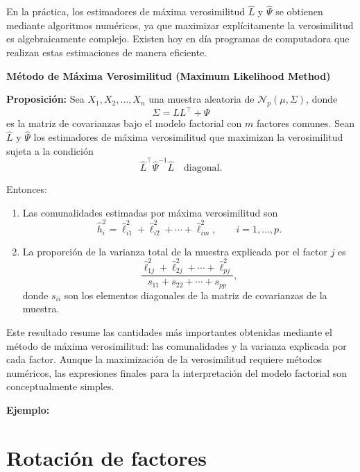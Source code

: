 \documentclass[
]{book}
\newenvironment{blackbox}{
  \definecolor{shadecolor}{HTML}{8B8989}%
  \color{white}
  \begin{shaded}}
 {\end{shaded}}
\begin{document}
En la práctica, los estimadores de máxima verosimilitud \(\hat{L}\) y \(\hat{\Psi}\)
se obtienen mediante algoritmos numéricos, ya que maximizar explícitamente la
verosimilitud es algebraicamente complejo. Existen hoy en día programas de
computadora que realizan estas estimaciones de manera eficiente.

\begin{blackbox}

\begin{center}
\textbf{Método de Máxima Verosimilitud (Maximum Likelihood Method)}

\end{center}

\textbf{Proposición: } Sea \(X_1, X_2, \ldots, X_n\) una muestra aleatoria de \(\mathcal{N}_p(\mu,\Sigma)\),
donde
\[
\Sigma = LL^{\top} + \Psi
\]
es la matriz de covarianzas bajo el modelo factorial con \(m\) factores comunes.
Sean \(\hat{L}\) y \(\hat{\Psi}\) los estimadores de máxima verosimilitud que
maximizan la verosimilitud sujeta a la condición
\[
\hat{L}^{\top} \hat{\Psi}^{-1} \hat{L} \quad \text{diagonal}.
\]

Entonces:

\begin{enumerate}
\def\labelenumi{\arabic{enumi})}
\item
  Las comunalidades estimadas por máxima verosimilitud son
  \[
   \hat{h}_i^2 = \hat{\ell}_{i1}^2 + \hat{\ell}_{i2}^2 + \cdots + \hat{\ell}_{im}^2,
   \qquad i=1,\ldots,p.
   \]
\item
  La proporción de la varianza total de la muestra explicada por el
  factor \(j\) es
  \[
   \frac{
       \hat{\ell}_{1j}^2 + \hat{\ell}_{2j}^2 + \cdots + \hat{\ell}_{pj}^2
   }{
       s_{11} + s_{22} + \cdots + s_{pp}
   },
   \]
  donde \(s_{ii}\) son los elementos diagonales de la matriz de covarianzas de
  la muestra.
\end{enumerate}

\end{blackbox}

Este resultado resume las cantidades más importantes obtenidas mediante el
método de máxima verosimilitud: las comunalidades y la varianza explicada por
cada factor. Aunque la maximización de la verosimilitud requiere métodos
numéricos, las expresiones finales para la interpretación del modelo factorial
son conceptualmente simples.

\textbf{Ejemplo:}

\section{Rotación de factores}\label{rotaciuxf3n-de-factores}
\end{document}
